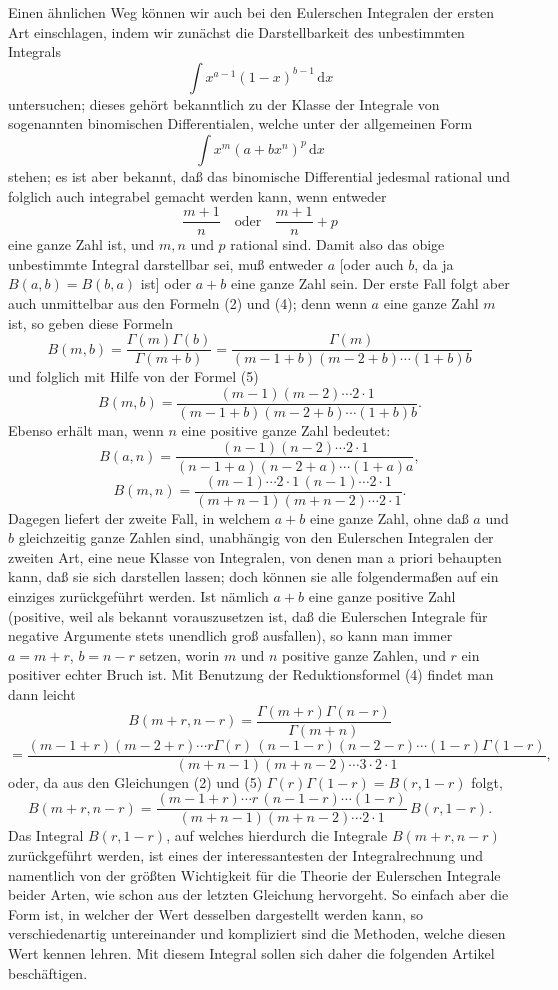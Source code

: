\documentclass[11pt]{article}
\newcommand{\dd}{\,\mathrm d}
\begin{document}
Einen ähnlichen Weg können wir auch bei den Eulerschen Integralen der ersten Art einschlagen, indem wir zunächst die Darstellbarkeit des unbestimmten Integrals
\[
\int x^{a-1}(1-x)^{b-1}\dd x
\]
untersuchen; dieses gehört bekanntlich zu der Klasse der Integrale von sogenannten binomischen Differentialen, welche unter der allgemeinen Form
\[
\int x^m(a+bx^n)^p\dd x
\]
stehen; es ist aber bekannt, daß das binomische Differential jedesmal rational und folglich auch integrabel gemacht werden kann, wenn entweder
\[
\frac{m+1}{n}\quad\text{oder}\quad \frac{m+1}{n}+p
\]
eine ganze Zahl ist, und $m,n$ und $p$ rational sind. Damit also das obige unbestimmte Integral darstellbar sei, muß entweder $a$ [oder auch $b$, da ja $B(a,b)=B(b,a)$ ist] oder $a+b$ eine ganze Zahl sein. Der erste Fall folgt aber auch unmittelbar aus den Formeln (2) und (4); denn wenn $a$ eine ganze Zahl $m$ ist, so geben diese Formeln
\[
B(m,b)=\frac{\Gamma(m)\Gamma(b)}{\Gamma(m+b)}=
\frac{\Gamma(m)}{(m-1+b)(m-2+b)\cdots(1+b)b}
\]
und folglich mit Hilfe von der Formel (5)
\begin{equation}
B(m,b)=\frac{(m-1)(m-2)\cdots2\cdot1}{(m-1+b)(m-2+b)\cdots(1+b)b}.
\tag{6}
\end{equation}
Ebenso erhält man, wenn $n$ eine positive ganze Zahl bedeutet:
\[
B(a,n)=\frac{(n-1)(n-2)\cdots2\cdot1}{(n-1+a)(n-2+a)\cdots(1+a)a},
\]
\[
B(m,n)=\frac{(m-1)\cdots2\cdot1\,(n-1)\cdots2\cdot1}{(m+n-1)(m+n-2)\cdots2\cdot1}.
\]
Dagegen liefert der zweite Fall, in welchem $a+b$ eine ganze Zahl, ohne daß $a$ und $b$ gleichzeitig ganze Zahlen sind, unabhängig von den Eulerschen Integralen der zweiten Art, eine neue Klasse von Integralen, von denen man a priori behaupten kann, daß sie sich darstellen lassen; doch können sie alle folgendermaßen auf ein einziges zurückgeführt werden. Ist nämlich $a+b$ eine ganze positive Zahl (positive, weil als bekannt vorauszusetzen ist, daß die Eulerschen Integrale für negative Argumente stets unendlich groß ausfallen), so kann man immer $a=m+r$, $b=n-r$ setzen, worin $m$ und $n$ positive ganze Zahlen, und $r$ ein positiver echter Bruch ist. Mit Benutzung der Reduktionsformel (4) findet man dann leicht
\[
B(m+r,n-r)=\frac{\Gamma(m+r)\Gamma(n-r)}{\Gamma(m+n)}
\]
\[
=\frac{(m-1+r)(m-2+r)\cdots r\Gamma(r)\,(n-1-r)(n-2-r)\cdots(1-r)\Gamma(1-r)}{(m+n-1)(m+n-2)\cdots3\cdot2\cdot1},
\]
oder, da aus den Gleichungen (2) und (5) $\Gamma(r)\Gamma(1-r)=B(r,1-r)$ folgt,
\begin{equation}
B(m+r,n-r)=\frac{(m-1+r)\cdots r\,(n-1-r)\cdots(1-r)}{(m+n-1)(m+n-2)\cdots2\cdot1}\,B(r,1-r).
\tag{7}
\end{equation}
Das Integral $B(r,1-r)$, auf welches hierdurch die Integrale $B(m+r,n-r)$ zurückgeführt werden, ist eines der interessantesten der Integralrechnung und namentlich von der größten Wichtigkeit für die Theorie der Eulerschen Integrale beider Arten, wie schon aus der letzten Gleichung hervorgeht. So einfach aber die Form ist, in welcher der Wert desselben dargestellt werden kann, so verschiedenartig untereinander und kompliziert sind die Methoden, welche diesen Wert kennen lehren. Mit diesem Integral sollen sich daher die folgenden Artikel beschäftigen.
\end{document}
